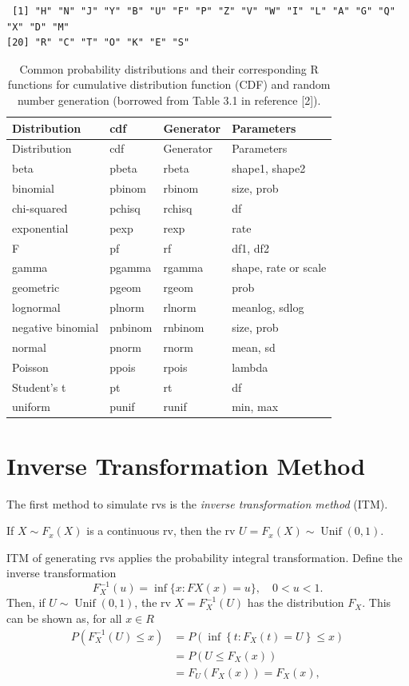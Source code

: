 \documentclass[
  letterpaper,
  DIV=11,
  numbers=noendperiod]{scrreprt}
\begin{document}
\begin{verbatim}
 [1] "H" "N" "J" "Y" "B" "U" "F" "P" "Z" "V" "W" "I" "L" "A" "G" "Q" "X" "D" "M"
[20] "R" "C" "T" "O" "K" "E" "S"
\end{verbatim}

\begin{longtable}[]{@{}llll@{}}
\caption{Common probability distributions and their corresponding R
functions for cumulative distribution function (CDF) and random number
generation (borrowed from Table 3.1 in reference
{[}2{]}).}\label{tbl-my-table}\tabularnewline
\toprule\noalign{}
Distribution & cdf & Generator & Parameters \\
\midrule\noalign{}
\endfirsthead
\toprule\noalign{}
Distribution & cdf & Generator & Parameters \\
\midrule\noalign{}
\endhead
\bottomrule\noalign{}
\endlastfoot
beta & pbeta & rbeta & shape1, shape2 \\
binomial & pbinom & rbinom & size, prob \\
chi-squared & pchisq & rchisq & df \\
exponential & pexp & rexp & rate \\
F & pf & rf & df1, df2 \\
gamma & pgamma & rgamma & shape, rate or scale \\
geometric & pgeom & rgeom & prob \\
lognormal & plnorm & rlnorm & meanlog, sdlog \\
negative binomial & pnbinom & rnbinom & size, prob \\
normal & pnorm & rnorm & mean, sd \\
Poisson & ppois & rpois & lambda \\
Student's t & pt & rt & df \\
uniform & punif & runif & min, max \\
\end{longtable}

\section{Inverse Transformation
Method}\label{inverse-transformation-method}

The first method to simulate rvs is the \emph{inverse transformation
method} (ITM).

If \(X\sim F_x(X)\) is a continuous rv, then the rv
\(U = F_x(X) \sim \operatorname{Unif}(0,1)\).

ITM of generating rvs applies the probability integral transformation.
Define the inverse transformation
\[ F^{−1}_X(u) = \inf\{x : FX (x) = u\},\quad  0 < u < 1.\] Then, if
\(U \sim \operatorname{Unif}(0,1)\), the rv \(X = F^{−1}_X(U)\) has the
distribution \(F_X\). This can be shown as, for all \(x \in R\)
\begin{align}
P\left(F_X^{-1}(U) \leq x\right) & =P\left(\inf \left\{t: F_X(t)=U\right\} \leq x\right) \\
& =P\left(U \leq F_X(x)\right) \\
& =F_U\left(F_X(x)\right)=F_X(x),
\end{align}
\end{document}
